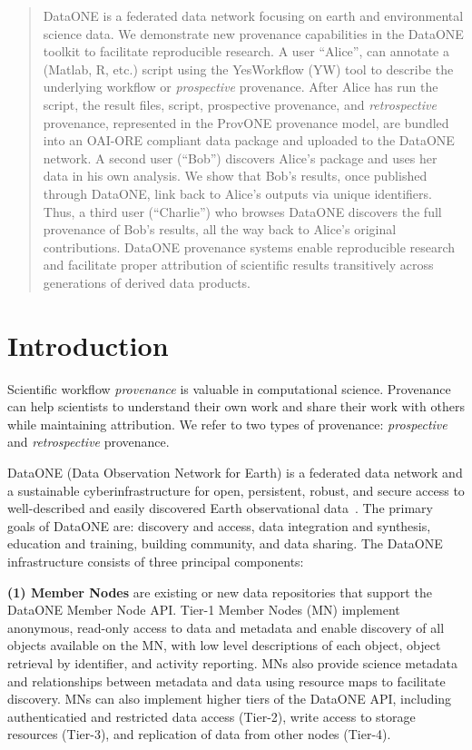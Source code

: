 \documentclass[a4paper]{llncs}
\newcommand{\mypara}[1]{\vspace{4pt}\noindent\textbf{#1}}
\begin{document}
\begin{abstract}
  DataONE is a federated data network focusing on earth and environmental science data.  We demonstrate new provenance capabilities in the DataONE toolkit to facilitate reproducible research. A user ``Alice'', can annotate a (Matlab, R, etc.) script using the YesWorkflow (YW) tool to describe the underlying workflow or \emph{prospective} provenance. After Alice has run the script, the result files, script, prospective provenance, and \emph{retrospective} provenance, represented in the ProvONE provenance model, are bundled into an OAI-ORE compliant data package and uploaded to the DataONE network. A second user (``Bob'') discovers Alice's package and uses her data in his own analysis. We show that Bob's results, once published through DataONE, link back to Alice's outputs via unique identifiers. Thus, a third user (``Charlie'') who browses DataONE discovers the full provenance of Bob's results, all the way back to Alice's original contributions.  DataONE provenance systems enable reproducible research and facilitate proper attribution of scientific results transitively across generations of derived data products.  \end{abstract}




\section{Introduction}

Scientific workflow \emph{provenance} is valuable in computational science. Provenance can help scientists to understand their own work and share their work with others while maintaining attribution. We refer to two types of provenance: \emph{prospective} and \emph{retrospective} provenance. 

DataONE (Data Observation Network for Earth) is a federated data network and a sustainable cyberinfrastructure for open, persistent, robust, and secure access to well-described and easily discovered Earth observational data~\cite{dataone}. The primary goals of DataONE are: discovery and access, data integration and synthesis, education and training, building community, and data sharing. The DataONE infrastructure consists of three principal components:


\mypara{(1) Member Nodes} are existing or new data repositories that support the DataONE Member Node API.  Tier-1 Member Nodes (MN) implement anonymous, read-only access to data and metadata and enable discovery of all objects available on the MN, with low level descriptions of each object, object retrieval by identifier, and activity reporting. MNs also provide science metadata and relationships between metadata and data using resource maps \cite{oaiore} to facilitate discovery.  MNs can also implement higher tiers of the DataONE API, including authenticatied and restricted data access (Tier-2), write access to storage resources (Tier-3), and replication of data from other nodes (Tier-4).
\end{document}
